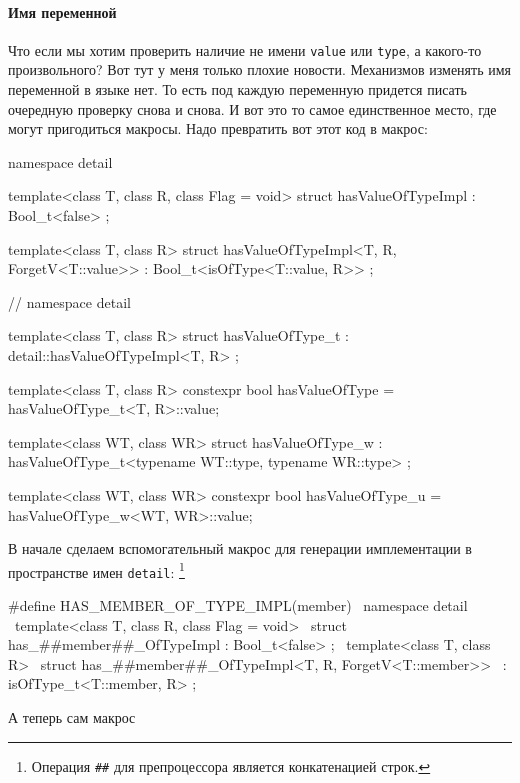 \paragraph{Имя переменной}
Что если мы хотим проверить наличие не имени \verb"value" или \verb"type", а какого-то произвольного?
Вот тут у меня только плохие новости.
Механизмов изменять имя переменной в языке нет.
То есть под каждую переменную придется писать очередную проверку снова и снова.
И вот это то самое единственное место, где могут пригодиться макросы.
Надо превратить вот этот код в макрос:
\begin{cppcode}
namespace detail {
template<class T, class R, class Flag = void>
struct hasValueOfTypeImpl : Bool_t<false> {};

template<class T, class R>
struct hasValueOfTypeImpl<T, R, ForgetV<T::value>> : Bool_t<isOfType<T::value, R>> {};
} // namespace detail

template<class T, class R>
struct hasValueOfType_t : detail::hasValueOfTypeImpl<T, R> {};

template<class T, class R>
constexpr bool hasValueOfType = hasValueOfType_t<T, R>::value;

template<class WT, class WR>
struct hasValueOfType_w
    : hasValueOfType_t<typename WT::type, typename WR::type> {};

template<class WT, class WR>
constexpr bool hasValueOfType_u = hasValueOfType_w<WT, WR>::value;
\end{cppcode}
В начале сделаем вспомогательный макрос для генерации имплементации в пространстве имен \verb"detail":%
\footnote{Операция \texttt{\#\#} для препроцессора является конкатенацией строк.}
\begin{cppcode}
#define HAS_MEMBER_OF_TYPE_IMPL(member)                                        \
  namespace detail {                                                           \
  template<class T, class R, class Flag = void>                                \
  struct has_##member##_OfTypeImpl : Bool_t<false> {};                         \
  template<class T, class R>                                                   \
  struct has_##member##_OfTypeImpl<T, R, ForgetV<T::member>>                   \
      : isOfType_t<T::member, R> {};                                           \
  }
\end{cppcode}
А теперь сам макрос

